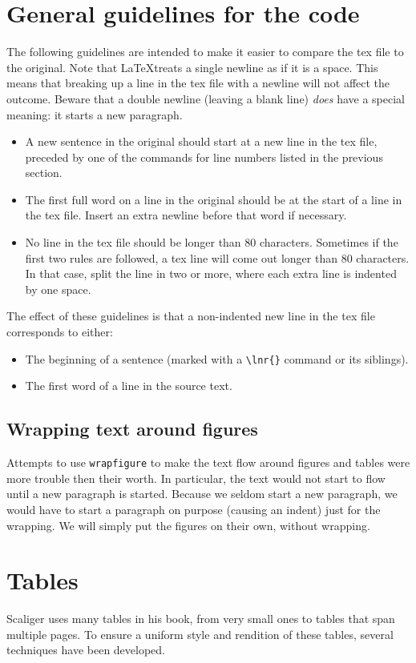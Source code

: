 \documentclass{report}
\begin{document}
\section{General guidelines for the \XeLaTeX code}
The following guidelines are intended to make it easier to compare the
tex file to the original.
Note that \LaTeX treats a single newline as if it is a space. This means that
breaking up a line in the tex file with a newline will not affect the outcome.
Beware that a double newline (leaving a blank line) \emph{does} have a
special meaning: it starts a new paragraph.
\begin{itemize}
\item A new sentence in the original should start at a new line in the tex file,
preceded by one of the commands for line numbers listed in the previous section.
\item The first full word on a line in the original should be at the start
of a line in the tex file.
Insert an extra newline before that word if necessary.
\item No line in the tex file should be longer than 80 characters.
Sometimes if the first two rules are followed, a tex line will come out
longer than 80 characters. In that case, split the line in two or more,
where each extra line is indented by one space.
\end{itemize}
The effect of these guidelines is that a non-indented new line
in the tex file corresponds
to either:
\begin{itemize}
\item The beginning of a sentence (marked with a \verb+\lnr{}+ command or
its siblings).
\item The first word of a line in the source text.
\end{itemize}

\subsection{Wrapping text around figures}
Attempts to use \verb+wrapfigure+ to make the text flow around figures
and tables were
more trouble then their worth. In particular, the text would not start to
flow until a new paragraph is started. Because we seldom start a new paragraph,
we would have to start a paragraph on purpose (causing an indent) just for the
wrapping. We will simply put the figures on their own, without wrapping.

\section{Tables}
Scaliger uses many tables in his book, from very small ones to tables that
span multiple pages.
To ensure a uniform style and rendition of these tables, several techniques
have been developed.
\end{document}
